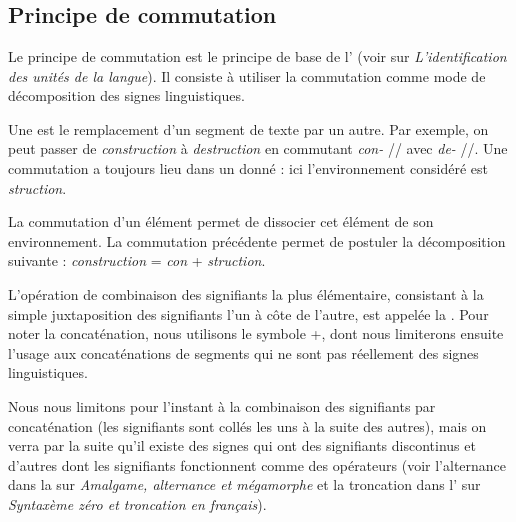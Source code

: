 \chapter{}\label{sec:2.2}

\section{Principe de commutation}\label{sec:2.2.0}

Le principe de commutation est le principe de base de l’ (voir  sur \textit{L’identification des unités de la langue}). Il consiste à utiliser la commutation comme mode de décomposition des signes linguistiques.

{Une  est le remplacement d’un segment de texte par un autre. Par exemple, on peut passer de \textit{construction} à \textit{destruction} en commutant \textit{con-} // avec \textit{de-} //. Une commutation a toujours lieu dans un  donné : ici l’environnement considéré est {\longrule}\textit{struction}.}

La commutation d’un élément permet de dissocier cet élément de son environnement. La commutation précédente permet de postuler la décomposition suivante : \textit{construction} = \textit{con} + \textit{struction}.

{L’opération de combinaison des signifiants la plus élémentaire, consistant à la simple juxtaposition des signifiants l'un à côte de l'autre, est appelée la . Pour noter la concaténation, nous utilisons le symbole +, dont nous limiterons ensuite l'usage aux concaténations de segments qui ne sont pas réellement des signes linguistiques.}

Nous nous limitons pour l’instant à la combinaison des signifiants par concaténation (les signifiants sont collés les uns à la suite des autres), mais on verra par la suite qu’il existe des signes qui ont des signifiants discontinus et d’autres dont les signifiants fonctionnent comme des opérateurs (voir l’alternance dans la  sur \textit{Amalgame, alternance et mégamorphe} et la troncation dans l’ sur \textit{Syntaxème zéro et troncation en français}).

